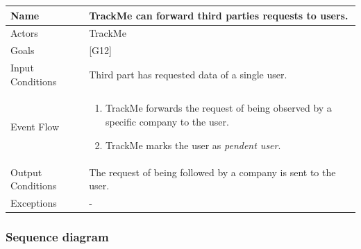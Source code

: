 \documentclass{article}
\begin{document}
\begin{center}
    \begin{tabular}{ | l | p{10cm} |}
    \hline
    Name & TrackMe can forward third parties requests to users. \\ \hline
    Actors & TrackMe\\ \hline
   	Goals & {[G12]}\\ \hline
    Input Conditions & Third part has requested data of a single user.\\ \hline
    Event Flow & \begin{enumerate}
    	\item TrackMe forwards the request of being observed by a specific company to the user.
    	\item TrackMe marks the user as \emph{pendent user}.
    \end{enumerate} \\ \hline
    Output Conditions & The request of being followed by a company is sent to the user. \\ \hline
    Exceptions & -    \\ \hline
    \end{tabular}
\end{center}

\subsubsection{Sequence diagram}
\end{document}
